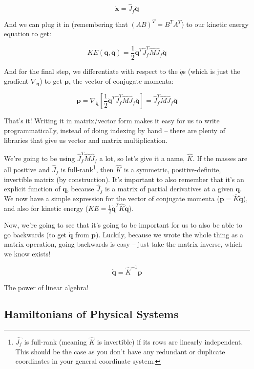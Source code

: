 \documentclass[]{article}
\begin{document}
\[
\dot{\mathbf{x}} = \hat{J}_f \dot{\mathbf{q}}
\]

And we can plug it in (remembering that \((A B)^T = B^T A^T\)) to our kinetic
energy equation to get:

\[
KE(\mathbf{q},\dot{\mathbf{q}}) = \frac{1}{2} \dot{\mathbf{q}}^T \hat{J}_f^T
    \hat{M} \hat{J}_f \dot{\mathbf{q}}
\]

And for the final step, we differentiate with respect to the \(\dot{q}\)s (which
is just the gradient \(\nabla_{\dot{\mathbf{q}}}\)) to get \(\mathbf{p}\), the
vector of conjugate momenta:

\[
\mathbf{p} = \nabla_{\dot{\mathbf{q}}} \left[
    \frac{1}{2} \dot{\mathbf{q}}^T \hat{J}_f^T \hat{M} \hat{J}_f \dot{\mathbf{q}}
  \right]
  = \hat{J}_f^T \hat{M} \hat{J}_f \dot{\mathbf{q}}
\]

That's it! Writing it in matrix/vector form makes it easy for us to write
programmatically, instead of doing indexing by hand -- there are plenty of
libraries that give us vector and matrix multiplication.

We're going to be using \(\hat{J}_f^T \hat{M} \hat{J}_f\) a lot, so let's give
it a name, \(\hat{K}\). If the masses are all positive and \(\hat{J}_f\) is
full-rank\footnote{\(\hat{J_f}\) is full-rank (meaning \(\hat{K}\) is
  invertible) if its rows are linearly independent. This should be the case as
  you don't have any redundant or duplicate coordinates in your general
  coordinate system.}, then \(\hat{K}\) is a symmetric, positive-definite,
invertible matrix (by construction). It's important to also remember that it's
an explicit function of \(\mathbf{q}\), because \(\hat{J}_f\) is a matrix of
partial derivatives at a given \(\mathbf{q}\). We now have a simple expression
for the vector of conjugate momenta (\(\mathbf{p} = \hat{K} \dot{\mathbf{q}}\)),
and also for kinetic energy
(\(KE = \frac{1}{2} \dot{\mathbf{q}}^T \hat{K} \dot{\mathbf{q}}\)).

Now, we're going to see that it's going to be important for us to also be able
to go backwards (to get \(\dot{\mathbf{q}}\) from \(\mathbf{p}\)). Luckily,
because we wrote the whole thing as a matrix operation, going backwards is easy
-- just take the matrix inverse, which we know exists!

\[
\dot{\mathbf{q}} = \hat{K}^{-1} \mathbf{p}
\]

The power of linear algebra!

\subsection{Hamiltonians of Physical
Systems}\label{hamiltonians-of-physical-systems}
\end{document}
